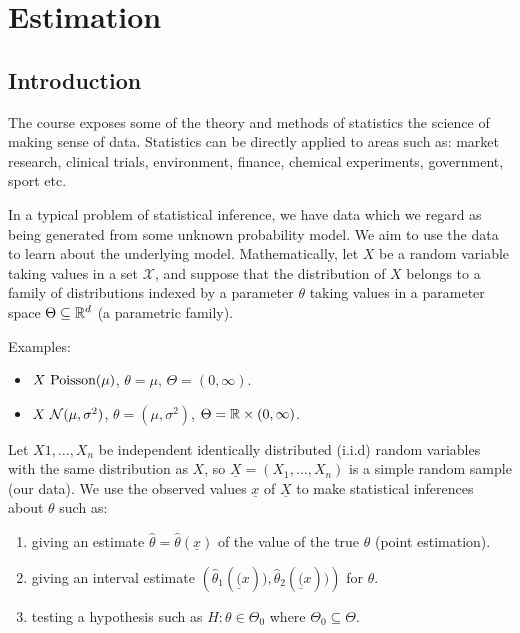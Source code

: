 
\section{Estimation}
\label{sec:1}

\subsection{Introduction}
\label{sec:1.1}

The course exposes some of the theory and methods of statistics \textemdash{} the science of making sense of data. Statistics can be directly applied to areas such as: market research, clinical trials, environment, finance, chemical experiments, government, sport etc.

In a typical problem of statistical inference, we have data which we regard as being generated from some unknown probability model. We aim to use the data to learn about the underlying model. Mathematically, let $X$ be a random variable taking values in a set $\mathscr{X}$, and suppose that the distribution of $X$ belongs to a family of distributions indexed by a parameter $\theta$ taking values in a parameter space $\Theta \subseteq \mathbb{R}^d$ (a parametric family).

Examples:
\begin{itemize}
\item  $X ~ \text{Poisson} (\mu)$, $\theta = \mu$, $\Theta = (0, \infty)$.
\item $X ~ \mathcal{N}(\mu, \sigma^2)$, $\theta = (\mu, \sigma^2)$, $\Theta = \mathbb{R} \times (0, \infty)$.
\end{itemize}

Let $X1, \dotsc, X_n$  be independent identically distributed (i.i.d) random variables with the same distribution as $X$, so $\underline{X} = \left(X_1, \dotsc, X_n\right)$ is a simple random sample (our data). We use the observed values $\underline{x}$ of $\underline{X}$ to make statistical inferences about $\theta$ such as:
\begin{enumerate}
\item giving an estimate $\hat{\theta} = \hat{\theta}(\underline{x})$ of the value of the true $\theta$ (point estimation).
\item giving an interval estimate $\left(\hat{\theta}_1(\underline(x)), \hat{\theta}_2(\underline(x))\right)$ for $\theta$.
\item testing a hypothesis such as $H: \theta \in \Theta_0$ where $\Theta_0 \subseteq \Theta$.
\end{enumerate}

